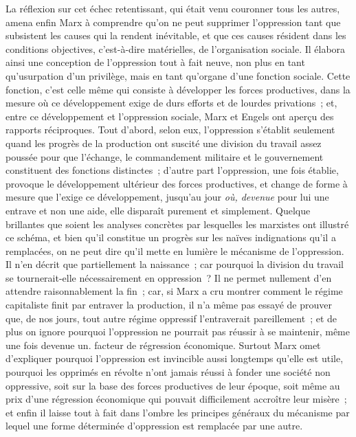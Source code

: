 \documentclass[french,twoside]{book} %
\begin{document}
La réflexion sur cet échec retentissant, qui était venu couronner tous les autres, amena enfin Marx à comprendre qu'on ne peut supprimer l'oppression tant que subsistent les causes qui la rendent inévitable, et que ces causes résident dans les conditions objectives, c'est-à-dire matérielles, de l'organisation sociale. Il élabora ainsi une conception de l'oppression tout à fait neuve, non plus en tant qu'usurpation d'un privilège, mais en tant qu'organe d'une fonction sociale. Cette fonction, c'est celle même qui consiste à développer les forces productives, dans la mesure où ce développement exige de durs efforts et de lourdes privations ; et, entre ce développement et l'oppression sociale, Marx et Engels ont aperçu des rapports réciproques. Tout d'abord, selon eux, l'oppression s'établit seulement quand les progrès de la production ont suscité une division du travail assez poussée pour que l'échange, le commandement militaire et le gouvernement constituent des fonctions distinctes ; d'autre part l'oppression, une fois établie, provoque le développement ultérieur des forces productives, et change de forme à mesure que l'exige ce développement, jusqu'au jour {\itshape où, devenue} pour lui une entrave et non une aide, elle disparaît purement et simplement. Quelque brillantes que soient les analyses concrètes par lesquelles les marxistes ont illustré ce schéma, et bien qu'il constitue un progrès sur les naïves indignations qu'il a remplacées, on ne peut dire qu'il mette en lumière le mécanisme de l'oppression. Il n'en décrit que partiellement la naissance ; car pourquoi la division du travail se tournerait-elle nécessairement en oppression ? Il ne permet nullement d'en attendre raisonnablement la fin ; car, si Marx a cru montrer comment le régime capitaliste finit par entraver la production, il n'a même pas essayé de prouver que, de nos jours, tout autre régime oppressif l'entraverait pareillement ; et de plus on ignore pourquoi l'oppression ne pourrait pas réussir à se maintenir, même une fois devenue un. facteur de régression économique. Surtout Marx omet d'expliquer pourquoi l'oppression est invincible aussi longtemps qu'elle est utile, pourquoi les opprimés en révolte n'ont jamais réussi à fonder une société non oppressive, soit sur la base des forces productives de leur époque, soit même au prix d'une régression économique qui pouvait difficilement accroître leur misère ; et enfin il laisse tout à fait dans l'ombre les principes généraux du mécanisme par lequel une forme déterminée d'oppression est remplacée par une autre.\par
\end{document}
